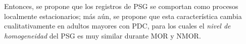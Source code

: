 Entonces, se propone que los registros de PSG se comportan como procesos localmente estacionarios; 
más aún, se propone que esta característica cambia cualitativamente en adultos mayores con PDC,
para los cuales el \textit{nivel de homogeneidad} del PSG es muy similar durante MOR y NMOR.


%
%
%
%

